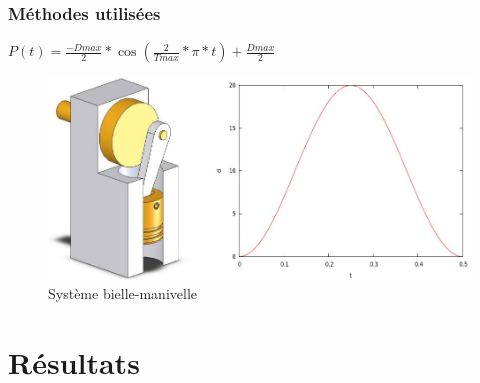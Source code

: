 \documentclass{beamer}
\begin{document}
\begin{frame}
    \frametitle{Méthodes utilisées}
    \begin{center}
        $P(t) = \frac{-Dmax}{2}*\cos(\frac{2}{Tmax}*\pi*t)+\frac{Dmax}{2}$
    \end{center}
    \begin{figure}
        \includegraphics[width=.7\textwidth]{img/bielle.jpg}
        \caption{Système bielle-manivelle}
    \end{figure}
\end{frame}


\section{Résultats}
\end{document}
